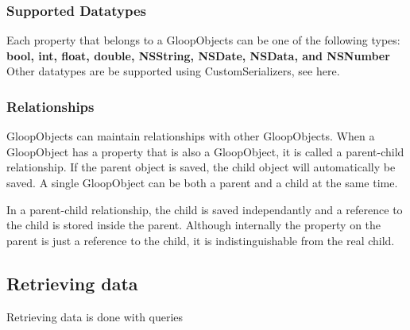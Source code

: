 \documentclass[]{article}
\begin{document}
\subsubsection{Supported Datatypes}\label{supported-datatypes}

Each property that belongs to a GloopObjects can be one of the following
types: \textbf{bool, int, float, double, NSString, NSDate, NSData, and
NSNumber} Other datatypes are be supported using CustomSerializers, see
here.

\subsubsection{Relationships}\label{relationships}

GloopObjects can maintain relationships with other GloopObjects. When a
GloopObject has a property that is also a GloopObject, it is called a
parent-child relationship. If the parent object is saved, the child
object will automatically be saved. A single GloopObject can be both a
parent and a child at the same time.

In a parent-child relationship, the child is saved independantly and a
reference to the child is stored inside the parent. Although internally
the property on the parent is just a reference to the child, it is
indistinguishable from the real child.

\subsection{Retrieving data}\label{retrieving-data}

Retrieving data is done with queries
\end{document}
